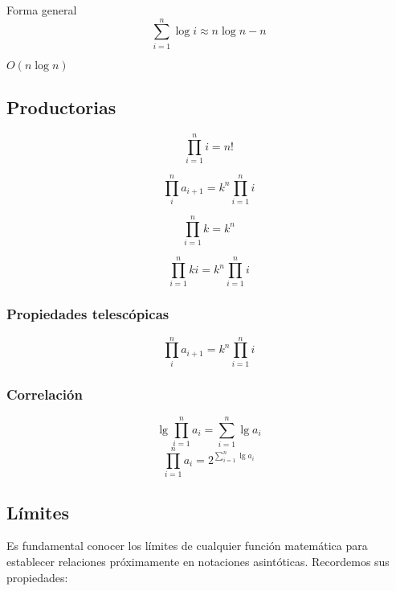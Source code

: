 \documentclass[tikz,11pt,fleqn]{book} %
\begin{document}
\begin{definition}[Logarítmica]
	Forma general
	$$ \sum_{i=1}^n\log i \approx
		n\log n-n$$
	\begin{fact}[Orden]
		$O(n\log n)$
	\end{fact}
\end{definition}

\subsection{Productorias}

\begin{definition}[Factorial]
	$$
		\prod_{i=1}^ni
		=n!
	$$
\end{definition}

\begin{definition}[Generalizada]
	$$
		\prod_{i}^n a_{i+1}
		=k^n\prod_{i=1}^ni
	$$
\end{definition}


\begin{definition}[Constante]
	$$
		\prod_{i=1}^nk
		=k^n
	$$
\end{definition}

\begin{definition}[Escalar]
	$$
		\prod_{i=1}^nki
		=k^n\prod_{i=1}^ni
	$$
\end{definition}

\subsubsection{Propiedades telescópicas}

\begin{definition}[Generalizada]
	$$
		\prod_{i}^n a_{i+1}
		=k^n\prod_{i=1}^ni
	$$
\end{definition}

\subsubsection{Correlación}
\begin{definition}
	$$
		\lg \prod_{i=1}^n a_i
		= \sum_{i=1}^n\lg a_i
	$$
	$$
		\prod_{i=1}^n a_i
		= 2^{\sum_{i=1}^n\lg a_i}
	$$
\end{definition}

\subsection{Límites}
Es fundamental conocer los límites de cualquier función matemática para establecer relaciones próximamente en notaciones asintóticas. Recordemos sus propiedades:
\end{document}
